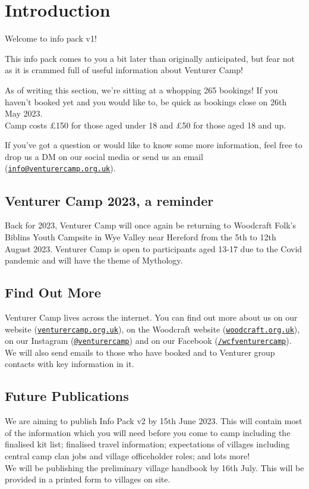 \documentclass[a4paper, 11pt]{report}
\newcommand{\nl}{\newline}
\begin{document}
\tableofcontents
\chapter{Introduction}
Welcome to info pack v1!\nl

This info pack comes to you a bit later than originally anticipated, but fear not as it is crammed full of useful information about Venturer Camp!\nl

As of writing this section, we're sitting at a whopping 265 bookings! If you haven't booked yet and you would like to, be quick as bookings close on 26th May 2023.\\
Camp costs £150 for those aged under 18 and £50 for those aged 18 and up.\nl

If you've got a question or would like to know some more information, feel free to drop us a DM on our social media or send us an email (\href{mailto:info@venturercamp.org.uk}{\texttt{info@venturercamp.org.uk}}).

\section{Venturer Camp 2023, a reminder}
Back for 2023, Venturer Camp will once again be returning to Woodcraft Folk's Biblins Youth Campsite in Wye Valley near Hereford from the 5th to 12th August 2023. Venturer Camp is open to participants aged 13-17 due to the Covid pandemic and will have the theme of Mythology. 

\section{Find Out More}
Venturer Camp lives across the internet. You can find out more about us on our website (\href{https://venturercamp.org.uk}{\texttt{venturercamp.org.uk}}), on the Woodcraft website (\href{https://woodcraft.org.uk}{\texttt{woodcraft.org.uk}}), on our Instagram (\href{https://www.instagram.com/venturercamp/}{\texttt{@venturercamp}}) and on our Facebook (\href{https://www.facebook.com/wcfventurercamp}{\texttt{/wcfventurercamp}}).
We will also send emails to those who have booked and to Venturer group contacts with key information in it.

\section{Future Publications}
We are aiming to publish Info Pack v2 by 15th June 2023. This will contain most of the information which you will need before you come to camp including the finalised kit list; finalised travel information; expectations of villages including central camp clan jobs and village officeholder roles; and lots more!\\
We will be publishing the preliminary village handbook by 16th July. This will be provided in a printed form to villages on site. 
\end{document}
